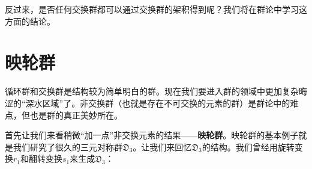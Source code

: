 \documentclass[12pt,UTF8,fontset=none]{ctexbook}
\begin{document}
反过来，是否任何交换群都可以通过交换群的架积得到呢？我们将在群论中学习这方面的结论。

\section{映轮群}

循环群和交换群是结构较为简单明白的群。现在我们要进入群的领域中更加复杂晦涩的“深水区域”了。非交换群（也就是存在不可交换的元素的群）是群论中的难点，但也是群的真正美妙所在。

首先让我们来看稍微“加一点”非交换元素的结果——\textbf{映轮群}。映轮群的基本例子就是我们研究了很久的三元对称群$\mathfrak{D}_3$。让我们来回忆$\mathfrak{D}_3$的结构。我们曾经用旋转变换$r_1$和翻转变换$s_1$来生成$\mathfrak{D}_3$：

\vspace{8pt}
\end{document}
